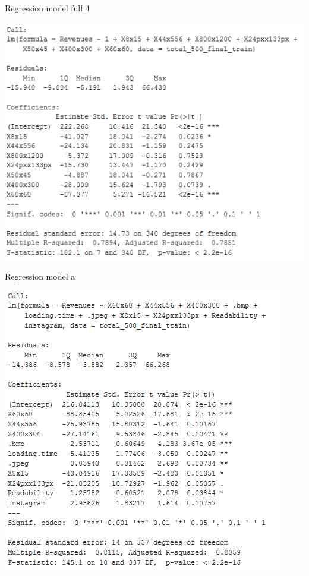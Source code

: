 \documentclass{book}
\begin{document}
\begin{table}[H]
\centering
\caption{Regression model full 4}\label{d :r :4}
\begin{center}
\includegraphics[scale=0.6]{../R/photos/77_full4.PNG}   \\
\end{center}
\end{table}


\begin{table}[H]
\centering
\caption{Regression model a}\label{d :r :a}
\begin{center}
\includegraphics[scale=0.6]{../R/photos/81_modela.PNG}   \\
\end{center}
\end{table}
\end{document}
